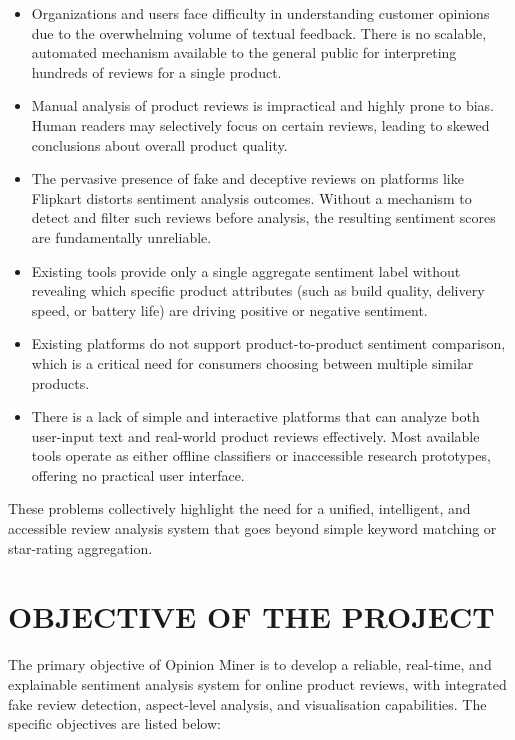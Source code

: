 \documentclass[12pt,a4paper]{report}
\begin{document}
\begin{itemize}
  \item Organizations and users face difficulty in understanding customer opinions due to the overwhelming volume of textual feedback. There is no scalable, automated mechanism available to the general public for interpreting hundreds of reviews for a single product.

  \item Manual analysis of product reviews is impractical and highly prone to bias. Human readers may selectively focus on certain reviews, leading to skewed conclusions about overall product quality.

  \item The pervasive presence of fake and deceptive reviews on platforms like Flipkart distorts sentiment analysis outcomes. Without a mechanism to detect and filter such reviews before analysis, the resulting sentiment scores are fundamentally unreliable.

  \item Existing tools provide only a single aggregate sentiment label without revealing which specific product attributes (such as build quality, delivery speed, or battery life) are driving positive or negative sentiment.

  \item Existing platforms do not support product-to-product sentiment comparison, which is a critical need for consumers choosing between multiple similar products.

  \item There is a lack of simple and interactive platforms that can analyze both user-input text and real-world product reviews effectively. Most available tools operate as either offline classifiers or inaccessible research prototypes, offering no practical user interface.
\end{itemize}

These problems collectively highlight the need for a unified, intelligent, and accessible review analysis system that goes beyond simple keyword matching or star-rating aggregation.

\section{OBJECTIVE OF THE PROJECT}

The primary objective of Opinion Miner is to develop a reliable, real-time, and explainable sentiment analysis system for online product reviews, with integrated fake review detection, aspect-level analysis, and visualisation capabilities. The specific objectives are listed below:
\end{document}
